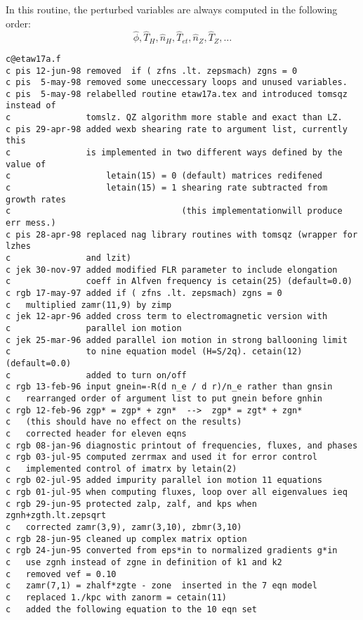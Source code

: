   
In this routine, the perturbed variables are always computed in
the following order:
\[ \hat{\phi}, \hat{T}_H, \hat{n}_H, \hat{T}_{et},
    \hat{n}_Z, \hat{T}_Z, \ldots \]


\begin{verbatim}
c@etaw17a.f
c pis 12-jun-98 removed  if ( zfns .lt. zepsmach) zgns = 0
c pis  5-may-98 removed some uneccessary loops and unused variables.
c pis  5-may-98 relabelled routine etaw17a.tex and introduced tomsqz instead of 
c               tomslz. QZ algorithm more stable and exact than LZ.
c pis 29-apr-98 added wexb shearing rate to argument list, currently this
c               is implemented in two different ways defined by the value of 
c                   letain(15) = 0 (default) matrices redifened
c                   letain(15) = 1 shearing rate subtracted from growth rates
c                                  (this implementationwill produce err mess.)
c pis 28-apr-98 replaced nag library routines with tomsqz (wrapper for lzhes
c               and lzit)
c jek 30-nov-97 added modified FLR parameter to include elongation
c               coeff in Alfven frequency is cetain(25) (default=0.0)
c rgb 17-may-97 added if ( zfns .lt. zepsmach) zgns = 0
c   multiplied zamr(11,9) by zimp
c jek 12-apr-96 added cross term to electromagnetic version with
c               parallel ion motion
c jek 25-mar-96 added parallel ion motion in strong ballooning limit
c               to nine equation model (H=S/2q). cetain(12) (default=0.0)
c               added to turn on/off
c rgb 13-feb-96 input gnein=-R(d n_e / d r)/n_e rather than gnsin
c   rearranged order of argument list to put gnein before gnhin
c rgb 12-feb-96 zgp* = zgp* + zgn*  -->  zgp* = zgt* + zgn*
c   (this should have no effect on the results)
c   corrected header for eleven eqns
c rgb 08-jan-96 diagnostic printout of frequencies, fluxes, and phases
c rgb 03-jul-95 computed zerrmax and used it for error control
c   implemented control of imatrx by letain(2)
c rgb 02-jul-95 added impurity parallel ion motion 11 equations
c rgb 01-jul-95 when computing fluxes, loop over all eigenvalues ieq
c rgb 29-jun-95 protected zalp, zalf, and kps when zgnh+zgth.lt.zepsqrt
c   corrected zamr(3,9), zamr(3,10), zbmr(3,10)
c rgb 28-jun-95 cleaned up complex matrix option
c rgb 24-jun-95 converted from eps*in to normalized gradients g*in
c   use zgnh instead of zgne in definition of k1 and k2
c   removed vef = 0.10
c   zamr(7,1) = zhalf*zgte - zone  inserted in the 7 eqn model
c   replaced 1./kpc with zanorm = cetain(11)
c   added the following equation to the 10 eqn set

\end{verbatim}
